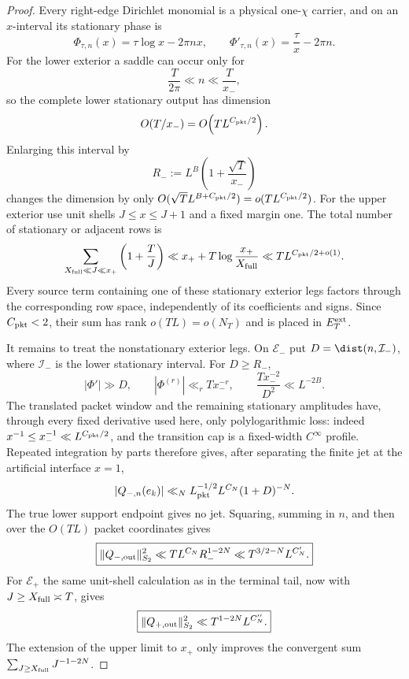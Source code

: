 \begin{proof}
Every right-edge Dirichlet monomial is a physical one-$\chi$ carrier, and on
an $x$-interval its stationary phase is
\[
\Phi_{\tau,n}(x)=\tau\log x-2\pi nx,
\qquad
\Phi'_{\tau,n}(x)=\frac\tau x-2\pi n.
\]
For the lower exterior a saddle can occur only for
\[
\frac{T}{2\pi}\ll n\ll\frac{T}{x_-},
\]
so the complete lower stationary output has dimension
\[
O(T/x_-)=O\!\left(TL^{C_{\rm pkt}/2}\right).
\]
Enlarging this interval by
\[
R_-:=L^B\left(1+\frac{\sqrt T}{x_-}\right)
\]
changes the dimension by only
$O(\sqrt T L^{B+C_{\rm pkt}/2})=o(TL^{C_{\rm pkt}/2})$.
For the upper exterior use unit shells $J\le x\le J+1$ and a fixed margin one.
The total number of stationary or adjacent rows is
\[
\sum_{X_{\rm full}\ll J\ll x_+}
\left(1+\frac TJ\right)
\ll x_++T\log\frac{x_+}{X_{\rm full}}
\ll T L^{C_{\rm pkt}/2+o(1)}.
\]
Every source term containing one of these stationary exterior legs factors
through the corresponding row space, independently of its coefficients and
signs.  Since $C_{\rm pkt}<2$, their sum has rank
$o(TL)=o(N_T)$ and is placed in $E_T^{\rm ext}$.

It remains to treat the nonstationary exterior legs. On $\mathcal E_-$ put
$D=\dist(n,\mathcal I_-)$, where $\mathcal I_-$ is the lower stationary
interval.  For $D\ge R_-$,
\[
|\Phi'|\gg D,
\qquad
|\Phi^{(r)}|\ll_rTx_-^{-r},
\qquad
\frac{Tx_-^{-2}}{D^2}\ll L^{-2B}.
\]
The translated packet window and the remaining stationary amplitudes have,
through every fixed derivative used here, only polylogarithmic loss: indeed
$x^{-1}\le x_-^{-1}\ll L^{C_{\rm pkt}/2}$, and the transition cap is a
fixed-width $C^\infty$ profile. Repeated integration by parts therefore gives,
after separating the finite jet at the artificial interface $x=1$,
\[
|Q_{-,n}(e_k)|
\ll_N
L_{\rm pkt}^{-1/2}L^{C_N}(1+D)^{-N}.
\]
The true lower support endpoint gives no jet.  Squaring, summing in $n$, and
then over the $O(TL)$ packet coordinates gives
\begin{equation}
\boxed{
\|Q_{-,\rm out}\|_{S_2}^2
\ll T L^{C_N}R_-^{1-2N}
\ll T^{3/2-N}L^{C_N'}.
}
\label{eq:lower-exterior-analysis-HS}
\end{equation}
For $\mathcal E_+$ the same unit-shell calculation as in the terminal tail,
now with $J\ge X_{\rm full}\asymp T$, gives
\begin{equation}
\boxed{
\|Q_{+,\rm out}\|_{S_2}^2
\ll T^{1-2N}L^{C_N''}.
}
\label{eq:upper-exterior-analysis-HS}
\end{equation}
The extension of the upper limit to $x_+$ only improves the convergent sum
$\sum_{J\ge X_{\rm full}}J^{-1-2N}$.


\end{proof}
